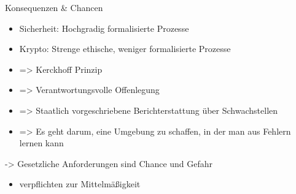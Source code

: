 \begin{frame}{Konsequenzen \& Chancen}
  \begin{itemize}
    \item  Sicherheit: Hochgradig formalisierte Prozesse
    \item  Krypto: Strenge ethische, weniger formalisierte Prozesse 
    \item  => Kerckhoff Prinzip
    \item  => Verantwortungsvolle Offenlegung
    \item  => Staatlich vorgeschriebene Berichterstattung über Schwachstellen
    \item  => Es geht darum, eine Umgebung zu schaffen, in der man aus Fehlern lernen kann
  \end{itemize}
    \item -> Gesetzliche Anforderungen sind Chance und Gefahr
    \begin{itemize}
      \item verpflichten zur Mittelmäßigkeit
    \end{itemize}
\end{frame}
